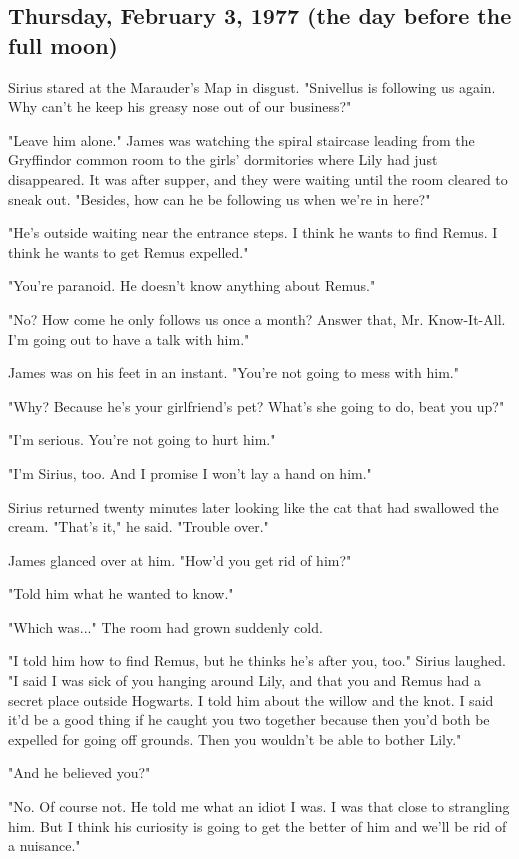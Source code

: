 \subsection{Thursday, February 3, 1977 (the day before the full moon)}

Sirius stared at the Marauder's Map in disgust. "Snivellus is following us again. Why can't he keep his greasy nose out of our business?"

"Leave him alone." James was watching the spiral staircase leading from the Gryffindor common room to the girls' dormitories where Lily had just disappeared. It was after supper, and they were waiting until the room cleared to sneak out. "Besides, how can he be following us when we're in here?"

"He's outside waiting near the entrance steps. I think he wants to find Remus. I think he wants to get Remus expelled."

"You're paranoid. He doesn't know anything about Remus."

"No? How come he only follows us once a month? Answer that, Mr. Know-It-All. I'm going out to have a talk with him."

James was on his feet in an instant. "You're not going to mess with him."

"Why? Because he's your girlfriend's pet? What's she going to do, beat you up?"

"I'm serious. You're not going to hurt him."

"I'm Sirius, too. And I promise I won't lay a hand on him."

Sirius returned twenty minutes later looking like the cat that had swallowed the cream. "That's it," he said. "Trouble over."

James glanced over at him. "How'd you get rid of him?"

"Told him what he wanted to know."

"Which was..." The room had grown suddenly cold.

"I told him how to find Remus, but he thinks he's after you, too." Sirius laughed. "I said I was sick of you hanging around Lily, and that you and Remus had a secret place outside Hogwarts. I told him about the willow and the knot. I said it'd be a good thing if he caught you two together because then you'd both be expelled for going off grounds. Then you wouldn't be able to bother Lily."

"And he believed you?"

"No. Of course not. He told me what an idiot I was. I was that close to strangling him. But I think his curiosity is going to get the better of him and we'll be rid of a nuisance."


